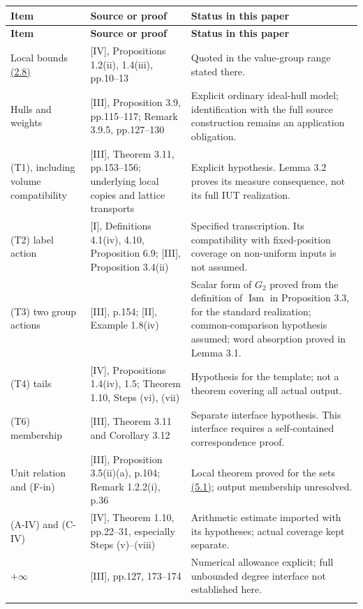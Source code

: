 \documentclass[11pt,a4paper]{amsart}
\begin{document}
\Needspace{130pt}
{\footnotesize
\setlength{\tabcolsep}{4pt}
\begin{longtable}{@{}P{0.2\textwidth}P{0.44\textwidth}P{0.29\textwidth}@{}}
\toprule
\textbf{Item} & \textbf{Source or proof} & \textbf{Status in this paper}\\\midrule
\endfirsthead
\toprule
\textbf{Item} & \textbf{Source or proof} & \textbf{Status in this paper}\\\midrule
\endhead
\bottomrule\endfoot
Local bounds \hyperref[eq:2.8]{(2.8)} & [IV], Propositions 1.2(ii), 1.4(iii), pp.10--13 & Quoted in the value-group range stated there.\\\addlinespace[3pt]
Hulls and weights & [III], Proposition 3.9, pp.115--117; Remark 3.9.5, pp.127--130 & Explicit ordinary ideal-hull model; identification with the full source construction remains an application obligation.\\\addlinespace[3pt]
(T1), including volume compatibility & [III], Theorem 3.11, pp.153--156; underlying local copies and lattice transports & Explicit hypothesis. Lemma 3.2 proves its measure consequence, not its full IUT realization.\\\addlinespace[3pt]
(T2) label action & [I], Definitions 4.1(iv), 4.10, Proposition 6.9; [III], Proposition 3.4(ii) & Specified transcription. Its compatibility with fixed-position coverage on non-uniform inputs is not assumed.\\\addlinespace[3pt]
(T3) two group actions & [III], p.154; [II], Example 1.8(iv) & Scalar form of $G_2$ proved from the definition of $\operatorname{Ism}$ in Proposition 3.3, for the standard realization; common-comparison hypothesis assumed; word absorption proved in Lemma 3.1.\\\addlinespace[3pt]
(T4) tails & [IV], Propositions 1.4(iv), 1.5; Theorem 1.10, Steps (vi), (vii) & Hypothesis for the template; not a theorem covering all actual output.\\\addlinespace[3pt]
(T6) membership & [III], Theorem 3.11 and Corollary 3.12 & Separate interface hypothesis. This interface requires a self-contained correspondence proof.\\\addlinespace[3pt]
Unit relation and (F-in) & [III], Proposition 3.5(ii)(a), p.104; Remark 1.2.2(i), p.36 & Local theorem proved for the sets \hyperref[eq:5.1]{(5.1)}; output membership unresolved.\\\addlinespace[3pt]
(A-IV) and (C-IV) & [IV], Theorem 1.10, pp.22--31, especially Steps (v)--(viii) & Arithmetic estimate imported with its hypotheses; actual coverage kept separate.\\\addlinespace[3pt]
$+\infty$ & [III], pp.127, 173--174 & Numerical allowance explicit; full unbounded degree interface not established here.\\\addlinespace[3pt]
\end{longtable}
}
\end{document}
